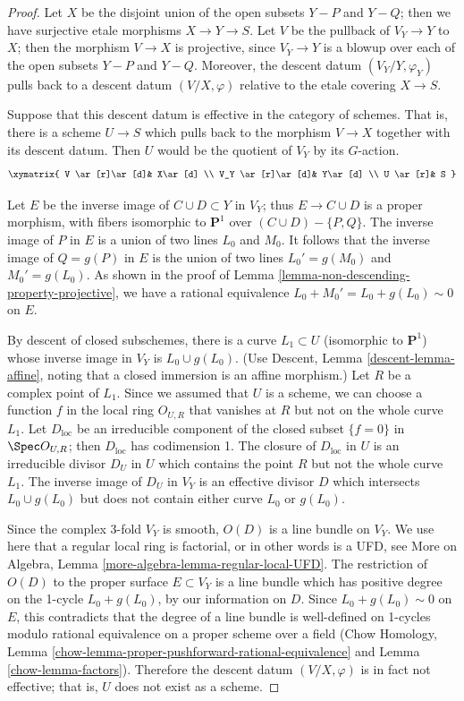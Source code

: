 \begin{proof}
\medskip\noindent
Let $X$ be the disjoint union of the open subsets $Y-P$ and $Y-Q$;
then we have surjective etale morphisms $X\to Y\to S$.
Let $V$ be the pullback of $V_Y\to Y$ to $X$; then the morphism
$V\to X$ is projective, since $V_Y\to Y$ is a blowup over each of the open
subsets $Y-P$ and $Y-Q$. Moreover, the descent datum $(V_Y/Y,\varphi_Y)$
pulls back to a descent datum $(V/X,\varphi)$ relative to the
etale covering $X\to S$.

\medskip\noindent
Suppose that this descent datum is effective in the category
of schemes. That is, there is a scheme $U\to S$
which pulls back to the morphism $V\to X$ together
with its descent datum. Then $U$ would be the quotient
of $V_Y$ by its $G$-action.
$$
\xymatrix{
V \ar[r]\ar[d]&  X\ar[d] \\
V_Y \ar[r]\ar[d]& Y\ar[d] \\
U \ar[r]& S
}
$$

\medskip\noindent
Let $E$ be the inverse image of $C\cup D\subset Y$ in $V_Y$;
thus $E\rightarrow C\cup D$ is a proper morphism, with fibers
isomorphic to ${\mathbf P}^1$ over $(C\cup D)-\{P,Q\}$.
The inverse image of $P$ in $E$ is a union of two lines $L_0$
and $M_0$. It follows that the inverse image of $Q=g(P)$ in $E$
is the union of two lines $L_0'=g(M_0)$ and $M_0'=g(L_0)$.
As shown in the proof
of Lemma \ref{lemma-non-descending-property-projective},
we have a rational equivalence $L_0+M_0'=L_0+g(L_0)\sim 0$ on $E$.

\medskip\noindent
By descent of closed subschemes, there is a curve $L_1\subset U$
(isomorphic to ${\mathbf P}^1$)
whose inverse image in $V_Y$ is $L_0\cup g(L_0)$. (Use Descent, Lemma
\ref{descent-lemma-affine}, noting that a closed immersion is an affine
morphism.)
Let $R$ be a complex point of $L_1$. Since
we assumed that $U$ is a scheme, we can choose a function
$f$ in the local ring $O_{U,R}$ that vanishes at $R$ but not
on the whole curve $L_1$. Let $D_{\text{loc}}$ be an irreducible component
of the closed subset $\{f = 0\}$ in $\Spec O_{U,R}$; then
$D_{\text{loc}}$ has codimension 1.
The closure of $D_{\text{loc}}$ in $U$ is an irreducible divisor $D_U$
in $U$ which contains the point $R$ but not the whole curve $L_1$.
The inverse image of $D_U$ in $V_Y$ is an effective divisor $D$
which intersects $L_0\cup g(L_0)$ but does not contain either
curve $L_0$ or $g(L_0)$.

\medskip\noindent
Since the complex 3-fold $V_Y$ is smooth, $O(D)$ is a line
bundle on $V_Y$. We use here that a regular local ring is factorial,
or in other words is a UFD, see
More on Algebra, Lemma \ref{more-algebra-lemma-regular-local-UFD}.
The restriction of $O(D)$ to the proper surface
$E\subset V_Y$ is a line bundle which has positive degree on the 1-cycle
$L_0+g(L_0)$, by our information on $D$. Since
$L_0+g(L_0)\sim 0$ on $E$, this contradicts 
that the degree of a line bundle is well-defined
on 1-cycles modulo rational equivalence on a proper scheme
over a field (Chow Homology,
Lemma \ref{chow-lemma-proper-pushforward-rational-equivalence}
and Lemma \ref{chow-lemma-factors}). Therefore the descent datum
$(V/X,\varphi)$ is in fact not effective; that is, $U$ does not exist
as a scheme.
\end{proof}
